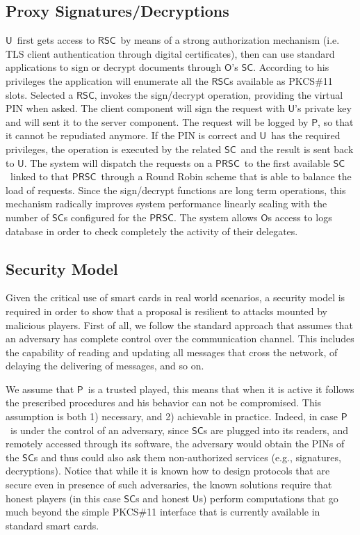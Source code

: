 \documentclass{sig-alternate}
\newcommand{\Owner}{\ensuremath{\mathsf{O}}}
\newcommand{\User}{\ensuremath{\mathsf{U}}}
\newcommand{\Proxy}{\ensuremath{\mathsf{P}}}
\newcommand{\SC}{\ensuremath{\mathsf{SC}}}
\newcommand{\RSC}{\ensuremath{\mathsf{RSC}}}
\newcommand{\PRSC}{\ensuremath{\mathsf{PRSC}}}
\begin{document}
\subsection{Proxy Signatures/Decryptions} 
\User\ first gets access to \RSC\ by means of a strong authorization mechanism (i.e. TLS client authentication through digital certificates), then can use standard applications to sign or decrypt documents through \Owner 's \SC . According to his privileges the application will enumerate all the \RSC s available as PKCS\#11 slots. Selected a \RSC , invokes the sign/decrypt operation, providing the virtual PIN when asked. The client component will sign the request with \User 's private key and will sent it to the server component. The request will be logged by \Proxy, so that it cannot be repudiated anymore. If the PIN is correct and \User\ has the required privileges, the operation is executed by the related \SC\ and the result is sent back to \User . The system will dispatch the requests on a \PRSC\ to the first available \SC\ linked to that \PRSC\ through a Round Robin scheme that is able to balance the load of requests. Since the sign/decrypt functions are long term operations, this mechanism radically improves system performance linearly scaling with the number of \SC s configured for the \PRSC . The system allows \Owner s access to logs database in order to check completely the activity of their delegates.


\subsection{Security Model}
Given the critical use of smart cards in real world scenarios, a security model is required in order to show that a proposal is resilient to attacks mounted by malicious players. First of all, we follow the standard approach that assumes that an adversary has complete control over the communication channel. This includes the capability of reading and updating all messages that cross the network, of delaying the delivering of messages, and so on.

We assume that \Proxy\ is a trusted played, this means that when it is active it follows the prescribed procedures and his behavior can not be compromised. This assumption is both 1) necessary, and 2) achievable in practice.
Indeed, in case \Proxy\ is under the control of an adversary, since \SC s are plugged into its readers, and remotely accessed through its software, the adversary would obtain the PINs of the \SC s and thus could also ask them non-authorized services (e.g., signatures, decryptions). Notice that while it is known how to design protocols that are secure even in presence of such adversaries, the known solutions require that honest players (in this case \SC s and honest \User s) perform computations that go much beyond the simple PKCS\#11 interface that is currently available in standard smart cards.
\end{document}
